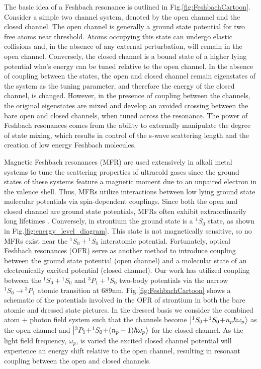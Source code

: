 The basic idea of a Feshbach resonance is outlined in Fig.\;\ref{fig:FeshbachCartoon}. Consider a simple two channel system, denoted by the open channel and the closed channel. The open channel is generally a ground state potential for two free atoms near threshold. Atoms occupying this state can undergo elastic collisions and, in the absence of any external perturbation, will remain in the open channel. Conversely, the closed channel is a bound state of a higher lying potential who's energy can be tuned relative to the open channel. In the absence of coupling between the states, the open and closed channel remain eigenstates of the system as the tuning parameter, and therefore the energy of the closed channel, is changed. However, in the presence of coupling between the channels, the original eigenstates are mixed and develop an avoided crossing between the bare open and closed channels, when tuned across the resonance. The power of Feshbach resonances comes from the ability to externally manipulate the degree of state mixing, which results in control of the s-wave scattering length and the creation of low energy Feshbach molecules.

Magnetic Feshbach resonances (MFR) are used extensively in alkali metal systems to tune the scattering properties of ultracold gases since the ground states of these systems feature a magnetic moment due to an unpaired electron in the valence shell. Thus, MFRs utilize interactions between low lying ground state molecular potentials via spin-dependent couplings. Since both the open and closed channel are ground state potentials, MFRs often exhibit extraordinarily long lifetimes \cite{Chin2010,Kohler2006}. Conversely, in strontium the ground state is a $^1S_0$ state, as shown in Fig.\;\ref{fig:energy_level_diagram}. This state is not magnetically sensitive, so no MFRs exist near the $^1S_0\!+\!^1S_0$ interatomic potential. Fortunately, optical Feshbach resonances (OFR) serve as another method to introduce coupling between the ground state potential (open channel) and a molecular state of an electronically excited potential (closed channel). Our work has utilized coupling between the $^1S_0\!+\!^1S_0$ and  $^3P_1\!+\!^1S_0$ two-body potentials via the narrow $^1S_0\!\rightarrow\!^3P_1$ atomic transition at 689nm. Fig.\;\ref{fig:FeshbachCartoon} shows a schematic of the potentials involved in the OFR of strontium in both the bare atomic and dressed state pictures. In the dressed basis we consider the combined atom + photon field system such that the channels become $\left| {^1S_0\!+\!^1S_0\!+\!n_p\hbar\omega_p} \right>$ as the open channel and $\left| {^3P_1\!+\!^1S_0\!+\!(n_p-1)\hbar\omega_p} \right>$ for the closed channel. As the light field frequency, $\omega_p$, is varied the excited closed channel potential will experience an energy shift relative to the open channel, resulting in resonant coupling between the open and closed channels. \cite{Ciuryo2005,Bohn1997,Fedichev1996a}

